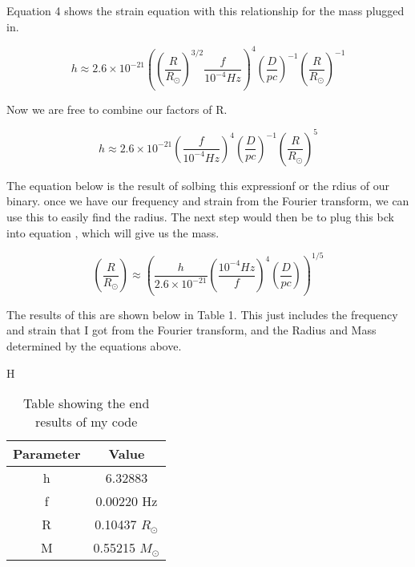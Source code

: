 \documentclass{article}
\begin{document}
Equation 4 shows the strain equation with this relationship for the mass plugged in.

\begin{equation}\label{nh}
h \approx 2.6 \times 10^{-21}  ( (\frac{R}{R_\odot})^{3/2} \frac{f}{10^{-4} Hz})^4 (\frac{D}{pc}) ^{-1}(\frac{R}{R_\odot})^{-1}
\end{equation}

Now we are free to combine our factors of R.

\begin{equation}\label{nh}
h \approx 2.6 \times 10^{-21}  ( \frac{f}{10^{-4} Hz})^4 (\frac{D}{pc}) ^{-1}(\frac{R}{R_\odot})^{5}
\end{equation}

The equation below is the result of solbing this expressionf or the rdius of our binary. once we have our frequency and strain from the Fourier transform, we can use this to easily find the radius. The next step would then be to plug this bck into equation , which will give us the mass.

\begin{equation}\label{Radius}
   (\frac{R}{R_\odot}) \approx (\frac{h}{2.6 \times 10^{-21} }   ( \frac{10^{-4}Hz}{f})^4 (\frac{D}{pc}))^{1/5}
\end{equation}

The results of this are shown below in Table 1. This just includes the frequency and strain that I got from the Fourier transform, and the Radius and Mass determined by the equations above.

\begin{table}{H}\label{T1}
\caption{Table showing the end results of my code}
\begin{center}
\begin{tabular}{| c | c |}
\hline
Parameter & Value \\
\hline
h & 6.32883\\ 
\hline
f & 0.00220 Hz\\
\hline
R & 0.10437 $R_\odot$\\
\hline
M & 0.55215 $M_\odot$\\
\hline
\end{tabular}
\end{center}
\end{table}
\end{document}
